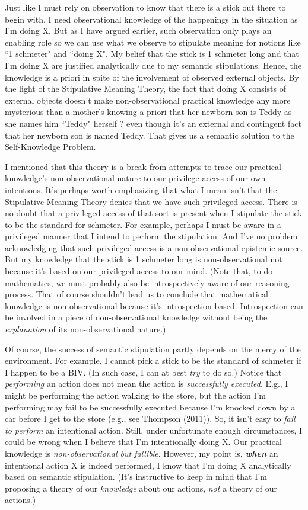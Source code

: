 \documentclass[a4paper,12pt]{article}
\begin{document}
Just like I must rely on observation to know that there is a stick out there to begin with, I need observational knowledge of the happenings in the situation as I'm doing X. But as I have argued earlier, such observation only plays an enabling role so we can use what we observe to stipulate meaning for notions like ``1 schmeter" and ``doing X". My belief that the stick is 1 schmeter long and that I'm doing X are justified analytically due to my semantic stipulations. Hence, the knowledge is a priori in spite of the involvement of observed external objects. By the light of the Stipulative Meaning Theory, the fact that doing X consists of external objects doesn't make non-observational practical knowledge any more mysterious than a mother's knowing a priori that her newborn son is Teddy as she names him ``Teddy" herself ? even though it's an external and contingent fact that her newborn son is named Teddy. That gives us a semantic solution to the Self-Knowledge Problem.

I mentioned that this theory is a break from attempts to trace our practical knowledge's non-observational nature to our privilege access of our own intentions. It's perhaps worth emphasizing that what I mean isn't that the Stipulative Meaning Theory denies that we have such privileged access. There is no doubt that a privileged access of that sort is present when I stipulate the stick to be the standard for schmeter. For example, perhaps I must be aware in a privileged manner that I intend to perform the stipulation. And I've no problem acknowledging that such privileged access is a non-observational epistemic source. But my knowledge that the stick is 1 schmeter long is non-observational not because it's based on our privileged access to our mind. (Note that, to do mathematics, we must probably also be introspectively aware of our reasoning process. That of course shouldn't lead us to conclude that mathematical knowledge is non-observational because it's introspection-based. Introspection can be involved in a piece of non-observational knowledge without being the \emph{explanation} of its non-observational nature.)

Of course, the success of semantic stipulation partly depends on the mercy of the environment. For example, I cannot pick a stick to be the standard of schmeter if I happen to be a BIV. (In such case, I can at best \emph{try} to do so.) Notice that \emph{performing} an action does not mean the action is \emph{successfully executed}. E.g., I might be performing the action walking to the store, but the action I'm performing may fail to be successfully executed because I'm knocked down by a car before I get to the store (e.g., see Thompson (2011)). So, it isn't easy to \emph{fail to perform} an intentional action. Still, under unfortunate enough circumstances, I could be wrong when I believe that I'm intentionally doing X. Our practical knowledge is \emph{non-observational but fallible}. However, my point is, \emph\textbf{{when}} an intentional action X is indeed performed, I know that I'm doing X analytically based on semantic stipulation. (It's instructive to keep in mind that I'm proposing a theory of our \emph{knowledge} about our actions, \emph{not} a theory of our actions.)
\end{document}
